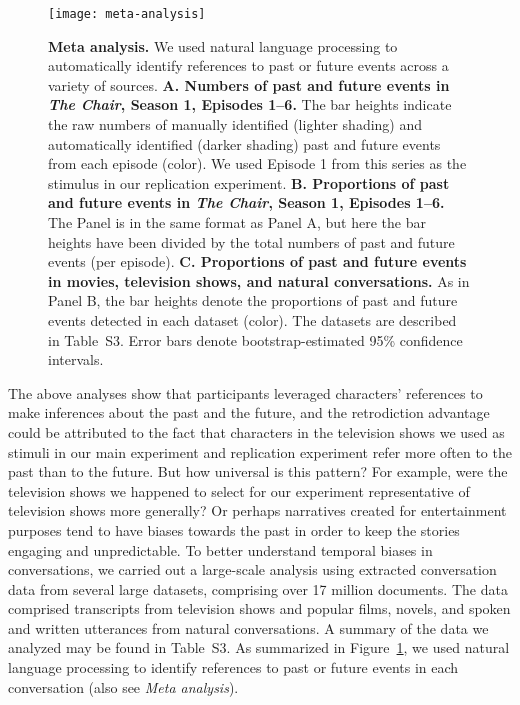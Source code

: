 \documentclass[10pt]{article}
\newcommand{\metaAnalysisDatasets}{S3}
\begin{document}
\begin{figure}[tp]
  \centering
  \texttt{[image: meta-analysis]}

\caption{\textbf{Meta analysis.} We used natural language processing to automatically identify references to past or future events across a variety of sources. \textbf{A. Numbers of past and future events in \textit{The Chair}, Season 1, Episodes 1--6.} The bar heights indicate the raw numbers of manually identified (lighter shading) and automatically identified (darker shading) past and future events from each episode (color). We used Episode 1 from this series as the stimulus in our replication experiment. \textbf{B. Proportions of past and future events in \textit{The Chair}, Season 1, Episodes 1--6.} The Panel is in the same format as Panel A, but here the bar heights have been divided by the total numbers of past and future events (per episode). \textbf{C. Proportions of past and future events in movies, television shows, and natural conversations.} As in Panel B, the bar heights denote the proportions of past and future events detected in each dataset (color). The datasets are described in Table~\metaAnalysisDatasets. Error bars denote bootstrap-estimated 95\% confidence intervals.}
  
  \label{fig:meta-analysis}
\end{figure}

The above analyses show that participants leveraged characters' references to make inferences about the past and the future, and the retrodiction advantage could be attributed to the fact that characters in the television shows we used as stimuli in our main experiment and replication experiment refer more often to the past than to the future. But how universal is this pattern? For example, were the television shows we happened to select for our experiment representative of television shows more generally? Or perhaps narratives created for entertainment purposes tend to have biases towards the past in order to keep the stories engaging and unpredictable. To better understand temporal biases in conversations, we carried out a large-scale analysis using extracted conversation data from several large datasets, comprising over 17 million documents. The data comprised transcripts from television shows and popular films, novels, and spoken and written utterances from natural conversations. A summary of the data we analyzed may be found in Table~\metaAnalysisDatasets. As summarized in Figure~\ref{fig:meta-analysis}, we used natural language processing to identify references to past or future events in each conversation (also see \textit{Meta analysis}).
\end{document}
